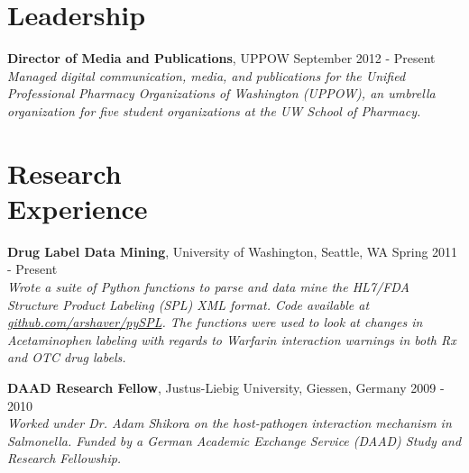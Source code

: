 \documentclass[margin,line]{resume}
\begin{document}
\begin{resume}

    \section{\mysidestyle Leadership}


       {\bf Director of Media and Publications}, UPPOW \hfill September 2012 - Present\\
    {\sl Managed digital communication, media, and publications for the Unified Professional Pharmacy Organizations of Washington (UPPOW), an umbrella organization for five student organizations at the UW School of Pharmacy.}




    \section{\mysidestyle Research\\Experience}

    {\bf Drug Label Data Mining}, University of Washington, Seattle, WA \hfill Spring 2011 - Present\\
    {\sl Wrote a suite of Python functions to parse and data mine the HL7/FDA Structure Product Labeling (SPL) XML format. Code available at \href{https://github.com/arshaver/pySPL}{github.com/arshaver/pySPL}. The functions were used to look at changes in Acetaminophen labeling with regards to Warfarin interaction warnings in both Rx and OTC drug labels.} 

    {\bf DAAD Research Fellow}, Justus-Liebig University, Giessen, Germany \hfill 2009 - 2010\\
    {\sl Worked under Dr. Adam Shikora on the host-pathogen interaction mechanism in {\it Salmonella}. Funded by a German Academic Exchange Service (DAAD) Study and Research Fellowship.}

\newpage


%
%


\end{resume}
\end{document}
